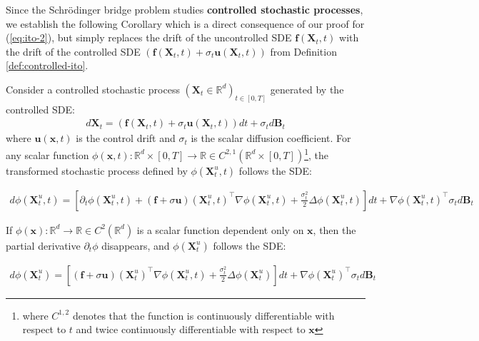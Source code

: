 \documentclass{article}
\newcommand{\boldtext}[1]{\textbf{\textcolor{MyGreen}{#1}}}
\begin{document}
Since the Schrödinger bridge problem studies \boldtext{controlled stochastic processes}, we establish the following Corollary which is a direct consequence of our proof for (\ref{eq:ito-2}), but simply replaces the drift of the uncontrolled SDE $\boldsymbol{f}(\boldsymbol{X}_t,t)$ with the drift of the controlled SDE $(\boldsymbol{f}(\boldsymbol{X}_t,t)+\sigma_t\boldsymbol{u}(\boldsymbol{X}_t,t))$ from Definition \ref{def:controlled-ito}.

\begin{corollary}\label{corollary:ito-controlled}
    Consider a controlled stochastic process $(\boldsymbol{X}_t\in \mathbb{R}^d)_{t\in [0,T]}$ generated by the controlled SDE:
    \begin{align}
        d\boldsymbol{X}_t=(\boldsymbol{f}(\boldsymbol{X}_t,t)+\sigma_t\boldsymbol{u}(\boldsymbol{X}_t,t))dt+ \sigma_td\boldsymbol{B}_t\tag{Controlled SDE}
    \end{align}
    where $\boldsymbol{u}(\boldsymbol{x},t)$ is the control drift and $\sigma_t$ is the scalar diffusion coefficient. For any scalar function $\phi(\boldsymbol{x},t):\mathbb{R}^d\times[0,T] \to \mathbb{R}\in C^{2,1}(\mathbb{R}^d\times [0,T])$\footnote{where $C^{1,2}$ denotes that the function is continuously differentiable with respect to $t$ and twice continuously differentiable with respect to $\boldsymbol{x}$}, the transformed stochastic process defined by $\phi(\boldsymbol{X}^u_t,t)$ follows the SDE:
    \begin{small}
    \begin{align}
        d\phi(\boldsymbol{X}^u_t,t)=\left[\partial_t\phi(\boldsymbol{X}^u_t,t)+(\boldsymbol{f}+\sigma\boldsymbol{u})(\boldsymbol{X}^u_t,t)^\top \nabla \phi(\boldsymbol{X}^u_t,t)+\frac{\sigma_t^2}{2}\Delta \phi(\boldsymbol{X}^u_t,t)\right]dt+ \nabla \phi(\boldsymbol{X}^u_t,t)^\top \sigma_td\boldsymbol{B}_t\tag{Controlled Itô Formula}\label{eq:control-ito-formula}
    \end{align}
    \end{small}
    If $\phi(\boldsymbol{x}):\mathbb{R}^d \to \mathbb{R}\in C^2(\mathbb{R}^d)$ is a scalar function dependent only on $\boldsymbol{x}$, then the partial derivative $\partial_t\phi$ disappears, and $\phi(\boldsymbol{X}^u_t)$ follows the SDE:
    \begin{small}
    \begin{align}
        d\phi(\boldsymbol{X}^u_t)=\left[(\boldsymbol{f}+\sigma\boldsymbol{u})(\boldsymbol{X}^u_t)^\top \nabla \phi(\boldsymbol{X}^u_t,t)+\frac{\sigma_t^2}{2}\Delta \phi(\boldsymbol{X}^u_t)\right]dt+ \nabla \phi(\boldsymbol{X}^u_t)^\top \sigma_td\boldsymbol{B}_t
    \end{align}
    \end{small}
\end{corollary}
\end{document}
